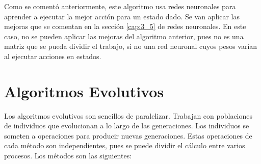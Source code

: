 			
		
		Como se comentó anteriormente, este algoritmo usa redes neuronales para aprender a ejecutar la mejor acción para un estado dado. Se van aplicar las mejoras que se comentan en la sección \ref{cap:3_5} de redes neuronales. En este caso, no se pueden aplicar las mejoras del algoritmo anterior, pues no es una matriz que se pueda dividir el trabajo, si no una red neuronal cuyos pesos varían al ejecutar acciones en estados. 	
		
		
	
		
	
	


\section{Algoritmos Evolutivos}
	\label{cap:3_4}
	Los algoritmos evolutivos son sencillos de paralelizar. Trabajan con poblaciones de individuos que evolucionan a lo largo de las generaciones. Los individuos se someten a operaciones para producir nuevas generaciones. Estas operaciones de cada método son independientes, pues se puede dividir el cálculo entre varios procesos. Los métodos son las siguientes: 
	

